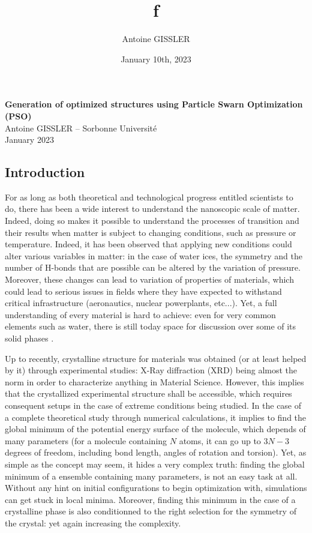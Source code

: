 \documentclass[11pt]{article}
\title{\textsf{\textbf{f}}}
\author{Antoine GISSLER}
\date{January 10th, 2023}
\begin{document}
\noindent\huge\textbf{\textsf{Generation of optimized structures using Particle Swarn Optimization (PSO)}}\normalsize\vspace{1em}\\
\large \textsf{Antoine GISSLER -- Sorbonne Université\\January 2023}
\begin{multicols}{2}
\section*{Introduction}

For as long as both theoretical and technological progress entitled scientists to do, there has been a wide interest to understand the nanoscopic scale of matter. Indeed, doing so makes it possible to understand the processes of transition and their results when matter is subject to changing conditions, such as pressure or temperature. Indeed, it has been observed that applying new conditions could alter various variables in matter: in the case of water ices, the symmetry and the number of H-bonds that are possible can be altered by the variation of pressure. Moreover, these changes can lead to variation of properties of materials, which could lead to serious issues in fields where they have expected to withstand critical infrastructure (aeronautics, nuclear powerplants, etc...). Yet, a full understanding of every material is hard to achieve: even for very common elements such as water, there is still today space for discussion over some of its solid phases \cite{Hansen2021-bk}.

Up to recently, crystalline structure for materials was obtained (or at least helped by it) through experimental studies: X-Ray diffraction (XRD) being almost the norm in order to characterize anything in Material Science. However, this implies that the crystallized experimental structure shall be accessible, which requires consequent setups in the case of extreme conditions being studied. In the case of a complete theoretical study through numerical calculations, it implies to find the global minimum of the potential energy surface of the molecule, which depends of many parameters (for a molecule containing $N$ atoms, it can go up to $3N-3$ degrees of freedom, including bond length, angles of rotation and torsion). Yet, as simple as the concept may seem, it hides a very complex truth: finding the global minimum of a ensemble containing many parameters, is not an easy task at all. Without any hint on initial configurations to begin optimization with, simulations can get stuck in local minima. Moreover, finding this minimum in the case of a crystalline phase is also conditionned to the right selection for the symmetry of the crystal: yet again increasing the complexity.\vspace{1em}


\end{multicols}
\end{document}
